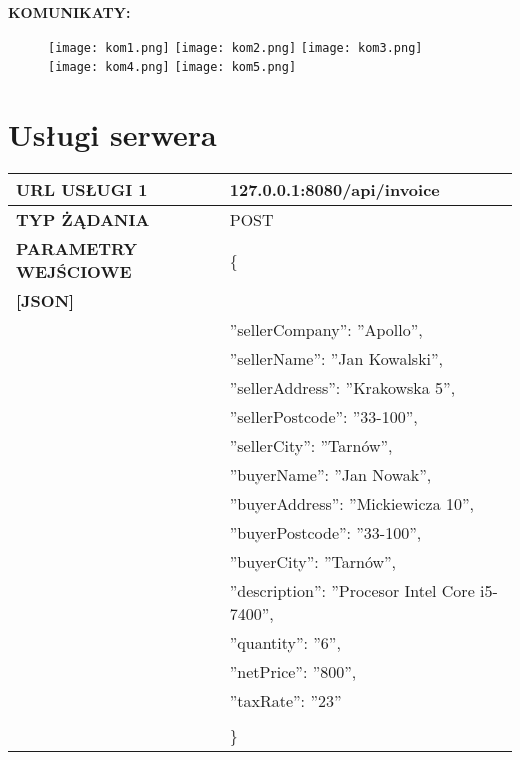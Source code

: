 \documentclass[11pt,a4paper]{article}
\begin{document}
\begin{center}
\large{\textbf{KOMUNIKATY:}}
\end{center}
\begin{figure}[!h]
\texttt{[image: kom1.png]}
\texttt{[image: kom2.png]}
\texttt{[image: kom3.png]}
\texttt{[image: kom4.png]}
\texttt{[image: kom5.png]}
\end{figure}



\newpage
\section{Usługi serwera}

\begin{table}[!h]
    \begin{tabular}{|l|l|}
    \hline
   \textbf{URL USŁUGI 1}               & 127.0.0.1:8080/api/invoice       \\ \hline
    \textbf{TYP ŻĄDANIA}                & POST                                                                                                                                                                                                                                                                                                                                                                                        \\ \hline
   \textbf{PARAMETRY WEJŚCIOWE } & \{ \\ \textbf{[JSON]} & \\ & ”sellerCompany”: ”Apollo”, \\ & ”sellerName”: ”Jan Kowalski”,\\ & ”sellerAddress”: ”Krakowska 5”,\\ & ”sellerPostcode”: ”33-100”, \\ & ”sellerCity”: ”Tarnów”, \\ & ”buyerName”: ”Jan Nowak”, \\ & ”buyerAddress”: ”Mickiewicza 10”,\\ & ”buyerPostcode”: ”33-100”, \\ & ”buyerCity”: ”Tarnów”,\\ & ”description”: ”Procesor Intel Core i5-7400”, \\ & ”quantity”: ”6”,\\ & ”netPrice”: ”800”, \\ & ”taxRate”: ”23” \\ & \\ & \} \\ \hline

\end{tabular}
\end{table}
\end{document}
